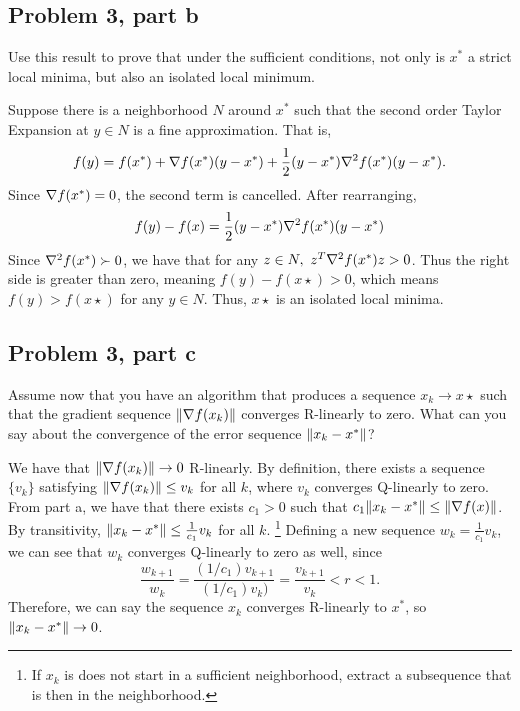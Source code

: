 \newpage
\subsection{Problem 3, part b}
Use this result to prove that under the sufficient conditions, not only is $x^*$ a strict local minima, but also an isolated local minimum. 
\partbreak
\begin{solution}

    Suppose there is a neighborhood $N$ around $x^*$ such that the second order Taylor Expansion at $y \in N$ is a fine approximation. That is,
    \[f(y) = f(x^*) + \nabla f(x^*)(y - x^*) + \frac{1}{2}(y - x^{*})\nabla ^2f(x^{*})(y - x^{*}).\]
    Since $\nabla f(x^{*}) = 0$, the second term is cancelled. After rearranging, 
    \[f(y) - f(x) = \frac{1}{2}(y - x^{*})\nabla ^2f(x^{*})(y - x^{*})\]
    Since $\nabla^2 f(x^{*}) \succ 0$, we have that for any $z \in N, \ z^T \nabla^2f(x^{*})z > 0$. Thus the right side is greater than zero, meaning $f(y) - f(x\star) > 0$, which means $f(y) > f(x\star)$ for any $y \in N$. Thus, $x\star$ is an isolated local minima.
\end{solution}

\newpage
\subsection{Problem 3, part c}
Assume now that you have an algorithm that produces a sequence $x_k \rightarrow x\star$ such that the gradient sequence $\norm{\nabla f(x_k)}$ converges R-linearly to zero. What can you say about the convergence of the error sequence $\norm{x_k - x^{*}}$? 
\partbreak
\begin{solution}

    We have that $\norm{\nabla f(x_k)} \rightarrow 0$ R-linearly. By definition, there exists a sequence $\{v_k\}$ satisfying $\norm{\nabla f(x_k)} \leq v_k$ for all $k$, where $v_k$ converges Q-linearly to zero. From part a, we have that there exists $c_1 > 0$ such that $c_1 \norm{x_k - x^{*}} \leq \norm{\nabla f(x)}$. By transitivity, $\norm{x_k - x^{*}} \leq \frac{1}{c_1}v_k$ for all $k$. \footnote{If $x_k$ is does not start in a sufficient neighborhood, extract a subsequence that is then in the neighborhood.} Defining a new sequence $w_k = \frac{1}{c_1}v_k$, we can see that $w_k$ converges Q-linearly to zero as well, since 
    \[\frac{w_{k+1}}{w_k} = \frac{(1/c_1)v_{k+1}}{(1/c_1)v_k)} = \frac{v_{k+1}}{v_k} < r < 1.\]
    Therefore, we can say the sequence $x_k$ converges R-linearly to $x^*$, so $\norm{x_k - x^{*}}\rightarrow 0$.
\end{solution}

